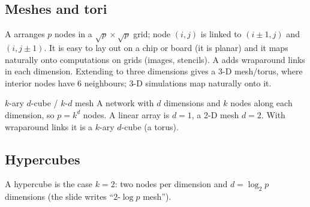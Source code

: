 \subsection{Meshes and tori}

\begin{center}
\end{center}

A  arranges $p$ nodes in a $\sqrt p\times\sqrt p$ grid; node $(i,j)$ is linked to $(i\pm1,j)$ and $(i,j\pm1)$.
It is easy to lay out on a chip or board (it is planar) and it maps naturally onto computations on grids (images, stencils). A  adds wraparound
links in each dimension. Extending to three dimensions gives a 3-D mesh/torus, where interior nodes have $6$ neighbours; 3-D simulations map naturally onto it.

\begin{definition}{$k$-ary $d$-cube / $k$-$d$ mesh}
A network with $d$ dimensions and $k$ nodes along each dimension, so $p=k^{d}$ nodes. A linear array is $d=1$, a 2-D mesh $d=2$. With wraparound links it is a
$k$-ary $d$-cube (a torus).
\end{definition}

\subsection{Hypercubes}

A hypercube is the case $k=2$: two nodes per dimension and $d=\log_2 p$ dimensions (the slide writes ``$2$-$\log p$ mesh'').

